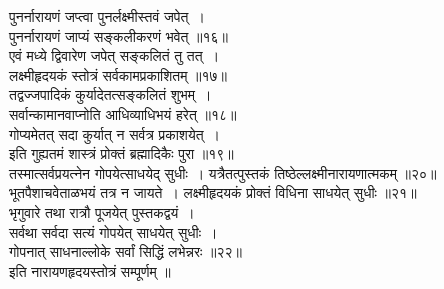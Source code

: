 \documentclass[twoside,top=1.7cm, bottom=1.7cm, outer=1cm,landscape, inner=1.5cm,a5paper,]{book}
\begin{document}
\begin{center}
पुनर्नारायणं जप्त्वा पुनर्लक्ष्मीस्तवं जपेत्~।\\
पुनर्नारायणं जाप्यं सङ्कलीकरणं भवेत् ॥१६॥\\[10pt]
एवं मध्ये द्विवारेण जपेत् सङ्कलितं तु तत्~।\\
लक्ष्मीहृदयकं स्तोत्रं सर्वकामप्रकाशितम् ॥१७॥\\[10pt]
तद्वज्जपादिकं कुर्यादेतत्सङ्कलितं शुभम्~।\\
सर्वान्कामानवाप्नोति आधिव्याधिभयं हरेत् ॥१८॥\\[10pt]
\newpage
गोप्यमेतत् सदा कुर्यात् न सर्वत्र प्रकाशयेत्~।\\
इति गुह्यतमं शास्त्रं प्रोक्तं ब्रह्मादिकैः पुरा ॥१९॥\\[10pt]
तस्मात्सर्वप्रयत्नेन गोपयेत्साधयेद्  सुधीः~।
यत्रैतत्पुस्तकं तिष्ठेल्लक्ष्मीनारायणात्मकम् ॥२०॥\\[10pt]
भूतपैशाचवेताळभयं तत्र न जायते~।
लक्ष्मीहृदयकं प्रोक्तं विधिना साधयेत् सुधीः ॥२१॥\\[10pt]
भृगुवारे तथा रात्रौ पूजयेत् पुस्तकद्वयं~।\\
सर्वथा सर्वदा सत्यं गोपयेत् साधयेत् सुधीः~।\\
गोपनात् साधनाल्लोके सर्वां सिद्धिं लभेन्नरः ॥२२॥\\[10pt]
इति नारायणहृदयस्तोत्रं सम्पूर्णम् ॥\\[10pt]

\end{center}
\end{document}
